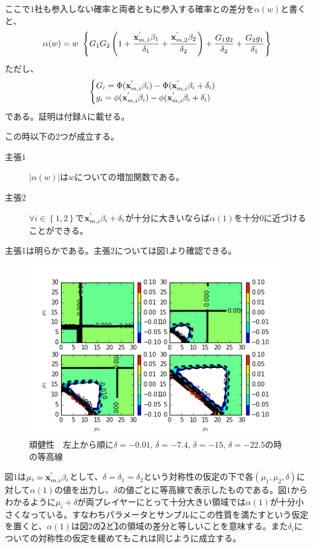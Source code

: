 ここで$1$社も参入しない確率と両者ともに参入する確率との差分を$\alpha(w)$と書くと、
\begin{align*}
	\alpha(w) = w\ \left\{ G_1 G_2 \left( 1 + \frac{{\bf x}_{m, 1}^{'} \beta_1}{\delta_1} + \frac{{\bf x}_{m, 2}^{'} \beta_2}{\delta_2} \right) + \frac{G_1g_2}{\delta_2} + \frac{G_2g_1}{\delta_1} \right\}
\end{align*}
ただし、
\begin{align*}
\begin{cases}
	G_i =  \Phi({\bf x}_{m, i}^{'} \beta_i) - \Phi({\bf x}_{m, i}^{'} \beta_i  + \delta_i)\\
	g_i = \phi({\bf x}_{m, i}^{'} \beta_i) - \phi({\bf x}_{m, i}^{'} \beta_i  + \delta_i)
\end{cases}
\end{align*}
である。証明は付録Aに載せる。

この時以下の2つが成立する。
\begin{description}
	\item[主張$1$] $\left| \alpha(w) \right|$は$w$についての増加関数である。
	\item[主張$2$] $\forall i \in \left\{ 1,2\right\}$で${\bf x}_{m, i}^{'} \beta_i + \delta_i$が十分に大きいならば$\alpha(1)$を十分0に近づけることができる。
\end{description}

主張1は明らかである。主張2については図1より確認できる。

\begin{figure}[t]
\centering
\includegraphics{diff3.png}
\caption{頑健性　左上から順に$\delta = -0.01$, $\delta = -7.4$, $\delta = -15$, $\delta = -22.5$の時の等高線}
\end{figure}

図$1$は$\mu_i = {\bf x}_{m, i}^{'} \beta_i$として、$\delta = \delta_1 = \delta_2$という対称性の仮定の下で各$(\mu_1, \mu_2, \delta)$に対して$\alpha(1)$の値を出力し、$\delta$の値ごとに等高線で表示したものである。図$1$からわかるように$\mu_i + \delta$が両プレイヤーにとって十分大きい領域では$\alpha(1)$が十分小さくなっている。すなわちパラメータとサンプルにこの性質を満たすという仮定を置くと、$\alpha(1)$は図$2$の\textcircled{\scriptsize 2}と\textcircled{\scriptsize 1}の領域の差分と等しいことを意味する。また$\delta_i$についての対称性の仮定を緩めてもこれは同じように成立する。


